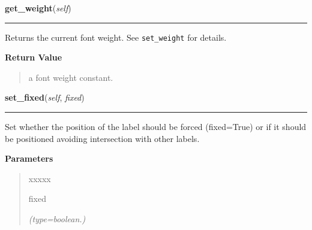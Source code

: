     \label{pygtk_chart:label:Label:get_weight}

    \vspace{0.5ex}

\hspace{.8\funcindent}\begin{boxedminipage}{\funcwidth}

    \raggedright \textbf{get\_weight}(\textit{self})

    \vspace{-1.5ex}

    \rule{\textwidth}{0.5\fboxrule}
\setlength{\parskip}{2ex}
    Returns the current font weight. See \texttt{set\_weight} for details.

\setlength{\parskip}{1ex}
      \textbf{Return Value}
    \vspace{-1ex}

      \begin{quote}
      a font weight constant.

      \end{quote}

    \end{boxedminipage}

    \label{pygtk_chart:label:Label:set_fixed}

    \vspace{0.5ex}

\hspace{.8\funcindent}\begin{boxedminipage}{\funcwidth}

    \raggedright \textbf{set\_fixed}(\textit{self}, \textit{fixed})

    \vspace{-1.5ex}

    \rule{\textwidth}{0.5\fboxrule}
\setlength{\parskip}{2ex}
    Set whether the position of the label should be forced (fixed=True) or 
    if it should be positioned avoiding intersection with other labels.

\setlength{\parskip}{1ex}
      \textbf{Parameters}
      \vspace{-1ex}

      \begin{quote}
        \begin{Ventry}{xxxxx}

          \item[fixed]

            {\it (type=boolean.)}

        \end{Ventry}

      \end{quote}

    \end{boxedminipage}

